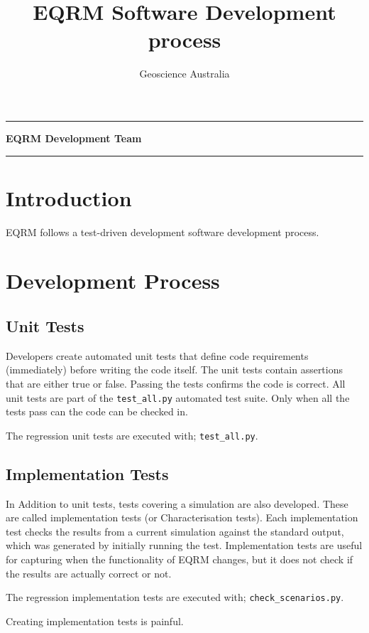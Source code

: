 \documentclass[a4paper, 12pt]{article}
\title{EQRM Software Development process}
\author{Geoscience Australia}
\makeatletter
\def\maketitle{%
\null
\thispagestyle{empty}%
\hrule height 0.5pt \vskip 2.5cm
\begin{center}
\normalfont
{\Large \textbf\@title\par}%
\vskip 2.5cm \normalsize \textbf{EQRM Development Team} \vskip 2.5cm
{\normalsize \textbf \@author\par}%
\vskip 4.53cm
{\normalsize \textbf \@date\par}%
\vskip 3.5cm \hrule height 0.5pt
\end{center}%
\null \clearpage }
\makeatother
\begin{document}
\maketitle

\section{Introduction}
EQRM follows a test-driven development software development process. 


\section{Development Process}

\subsection{Unit Tests}

Developers create automated unit tests that define code requirements
(immediately) before writing the code itself. The unit tests contain
assertions that are either true or false. Passing the tests confirms
the code is correct.  All unit tests are part of the \texttt{test\_all.py}
automated test suite.  Only when all the tests pass can the code can
be checked in.

The regression unit tests are executed with;
 \texttt{test\_all.py}.

\subsection{Implementation Tests}

In Addition to unit tests, tests covering a simulation are also
developed.  These are called implementation tests (or Characterisation
tests).  Each implementation test checks the results from a current
simulation against the standard output, which was generated by
initially running the test.  Implementation tests are useful for
capturing when the functionality of EQRM changes, but it does not
check if the results are actually correct or not.

The regression implementation tests are executed with;
 \texttt{check\_scenarios.py}.
 


Creating implementation tests is painful.  
 
\end{document}
